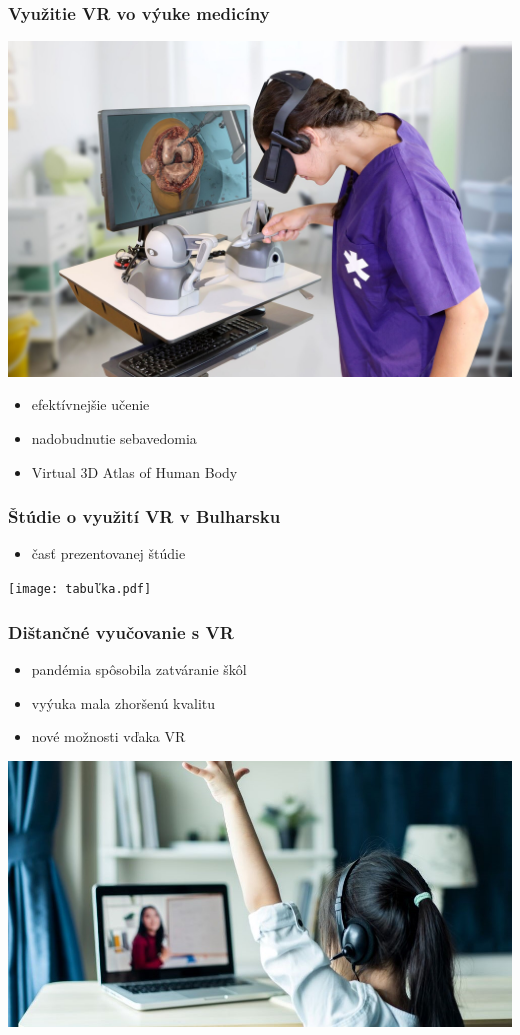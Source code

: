 \documentclass{beamer}
\begin{document}
\begin{frame}[fragile=singleslide]\frametitle{Využitie VR vo výuke medicíny}
\includegraphics[scale=.1]{VRM.jpeg}
\begin{itemize}
\item efektívnejšie učenie 
\item nadobudnutie sebavedomia
\item Virtual 3D Atlas of Human Body
\end{itemize}
\cite{Clanok2}
\end{frame}


\begin{frame}[fragile=singleslide]\frametitle{Štúdie o využití VR v Bulharsku}
\begin{itemize}
\item časť prezentovanej štúdie
\end{itemize}
\cite{Clanok1}
\texttt{[image: tabuľka.pdf]}
\cite{Clanok1}
\end{frame}


\begin{frame}[fragile=singleslide]\frametitle{Dištančné vyučovanie s VR}
\begin{itemize}
\item pandémia spôsobila zatváranie škôl
\item vyýuka mala zhoršenú kvalitu
\item nové možnosti vďaka VR
\end{itemize}
\includegraphics[scale=1]{DV.jpg}
\end{frame}
\end{document}
